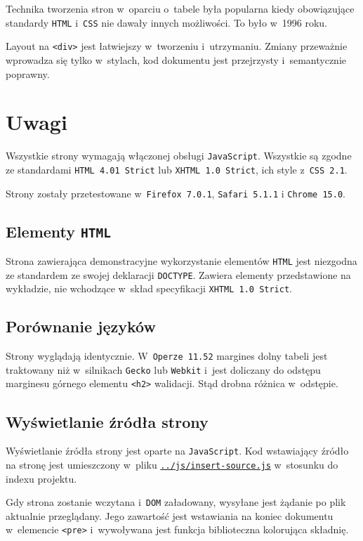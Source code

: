 \documentclass[10pt,a4paper]{article}
\newcommand{\f}[1]{\texttt{#1}}
\begin{document}
Technika tworzenia stron w~oparciu o~tabele była popularna kiedy obowiązujące
standardy \f{HTML} i~\f{CSS} nie dawały innych możliwości. To było w~1996 roku.

Layout na \f{<div>} jest łatwiejszy w~tworzeniu i~utrzymaniu. Zmiany przeważnie
wprowadza się tylko w~stylach, kod dokumentu jest przejrzysty i~semantycznie
poprawny.



\section{Uwagi}
Wszystkie strony wymagają włączonej obsługi \f{JavaScript}. Wszystkie są zgodne
ze standardami \f{HTML~4.01~Strict} lub \f{XHTML~1.0~Strict}, ich style
z~\f{CSS~2.1}.

Strony zostały przetestowane w~\f{Firefox 7.0.1}, \f{Safari 5.1.1} i \f{Chrome
15.0}.

\subsection{Elementy \f{HTML}}
Strona zawierająca demonstracyjne wykorzystanie elementów \f{HTML} jest
niezgodna ze standardem ze swojej deklaracji \f{DOCTYPE}. Zawiera elementy
przedstawione na wykładzie, nie wchodzące w~skład specyfikacji \f{XHTML 1.0
Strict}.

\subsection{Porównanie języków}
Strony wyglądają identycznie. W~\f{Operze 11.52} margines dolny tabeli jest
traktowany niż w~silnikach \f{Gecko} lub \f{Webkit} i~jest doliczany do odstępu
marginesu górnego elementu \f{<h2>} walidacji. Stąd drobna różnica w~odstępie.

\subsection{Wyświetlanie źródła strony}
Wyświetlanie źródła strony jest oparte na \f{JavaScript}. Kod wstawiający źródło
na stronę jest umieszczony w~pliku
\f{\href{https://github.com/student-tomasz/pi-laboratoria/blob/master/js/insert-source.js}{../js/insert-source.js}}
w~stosunku do indexu projektu.

Gdy strona zostanie wczytana i~\f{DOM} załadowany, wysyłane jest żądanie po plik
aktualnie przeglądany. Jego zawartość jest wstawiania na koniec dokumentu
w~elemencie \f{<pre>} i~wywoływana jest funkcja biblioteczna kolorująca
składnię.
\end{document}
